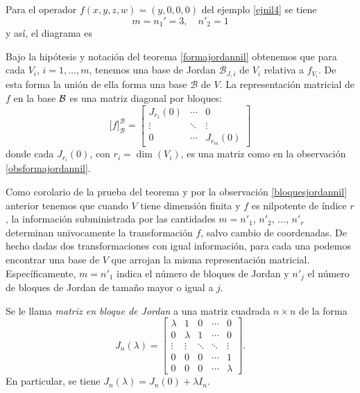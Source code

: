 \begin{ejem}
Para el operador $f(x,y,z,w)=(y,0,0,0)$ del ejemplo \ref{ejnil4} se tiene
$$m=n_1'=3,\quad n'_2=1$$
y así, el diagrama es\\
\begin{center}
\end{center}
\end{ejem}

\begin{obs}\label{bloquesjordannil}
Bajo la hip\'otesis y notación del teorema \ref{formajordannil} obtenemos que para cada $V_i$, $i=1,\ldots,m$, tenemos una base de Jordan $\mathcal{B}_{J,i}$ de $V_i$ relativa a $f_{V_i}$. De esta forma la uni\'on de ella forma una base $\mathcal{B}$ de $V$. La representaci\'on matricial de $f$ en la base $\mathcal{B}$ es una matriz diagonal por bloques:
\[
\Big[f\Big]^\mathcal{B}_\mathcal{B}=\left[\begin{array}{c|c|c}
J_{r_1}(0) & \cdots & 0\\
\hline
\vdots & \ddots & \vdots\\
\hline
0 & \cdots & J_{r_m}(0)
\end{array}\right] 
\]
donde cada $J_{r_i}(0)$, con $r_i=\dim(V_i)$, es una matriz como en la observaci\'on \ref{obsformajordannil}.
\end{obs}

\begin{obs}
Como corolario de la prueba del teorema y por la observación \ref{bloquesjordannil} anterior tenemos que cuando $V$ tiene dimensi\'on finita y $f$ es nilpotente de índice $r$, la informaci\'on subministrada por las cantidades $m=n'_1$, $n'_2$,  $\ldots$, $n'_r$ determinan univocamente la transformaci\'on $f$, salvo cambio de coordenadas. De hecho dadas dos transformaciones con igual informaci\'on, para cada una podemos encontrar una base de $V$ que arrojan la misma representaci\'on matricial. Espec\'ificamente, $m=n'_1$ indica el n\'umero de bloques de Jordan y $n'_j$ el n\'umero de bloques de Jordan de tama\~no mayor o igual a $j$.
\end{obs}

\begin{defn}
Se le llama \emph{matriz en bloque de Jordan} a una matriz cuadrada $n\times n$ de la forma
\[
J_n(\lambda)=\left[\begin{array}{ccccc}
\lambda & 1 & 0 &\cdots & 0\\
0 & \lambda & 1 &\cdots & 0\\
\vdots & \vdots & \ddots &\ddots & \vdots\\
0 & 0 & 0 & \cdots & 1\\
0 & 0 & 0 & \cdots & \lambda
\end{array}\right].
\]
En particular, se tiene $J_n(\lambda)=J_n(0)+\lambda I_n$.
\end{defn}

